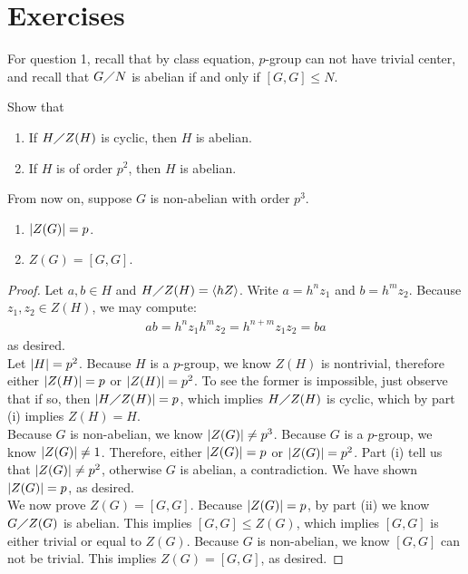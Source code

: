 \documentclass{report}
\begin{document}
\section{Exercises}
For question 1, recall that by class equation, $p$-group can not have trivial center, and recall that  $G\diagup N$ is abelian if and only if $[G,G]\leq N$. 
\begin{question}{}{}
Show that 
\begin{enumerate}[label=(\roman*)]
  \item If $H \diagup Z(H)$ is cyclic, then $H$ is abelian.  
  \item If $H$ is of order  $p^2$, then  $H$ is abelian.   
\end{enumerate}
From now on, suppose $G$ is non-abelian with order  $p^3$. 
\begin{enumerate}[label=(\roman*), start=3]
  \item $\left|Z(G)\right|=p$. 
  \item $Z(G)=[G,G]$.  
\end{enumerate}
\end{question}
\begin{proof}
Let $a,b\in H$ and $H \diagup Z(H)= \langle hZ\rangle $. Write $a=h^nz_1$ and $b=h^mz_2$. Because  $z_1,z_2 \in Z(H)$, we may compute: 
\begin{align*}
ab=h^nz_1h^mz_2=h^{n+m}z_1z_2=ba
\end{align*}
as desired. \\

Let $\left|H\right|=p^2$. Because $H$ is a  $p$-group, we know $Z(H)$ is nontrivial, therefore either $\left|Z(H)\right|=p$ or $\left|Z(H)\right|=p^2$. To see the former is impossible, just observe that if so, then $\left|H\diagup Z(H)\right|=p$, which implies $H\diagup Z(H)$ is cyclic, which by part (i) implies $Z(H)=H$. \\

Because $G$ is non-abelian, we know  $\left|Z(G)\right|\neq p^3$. Because $G$ is a  $p$-group, we know  $\left|Z(G)\right|\neq 1$. Therefore, either $\left|Z(G)\right|=p$ or $\left|Z(G)\right|=p^2$. Part (i) tell us that $\left|Z(G)\right|\neq p^2$, otherwise $G$ is abelian, a contradiction. We have shown  $\left|Z(G)\right|=p$, as desired. \\

We now prove $Z(G)=[G,G]$. Because $\left|Z(G)\right|=p$, by part (ii) we know $G\diagup Z(G)$ is abelian. This implies $[G,G] \leq  Z(G)$, which implies $[G,G]$ is either trivial or equal to $Z(G)$. Because $G$ is non-abelian, we know  $[G,G]$ can not be trivial. This implies $Z(G)=[G,G]$, as desired.
\end{proof}
\end{document}
